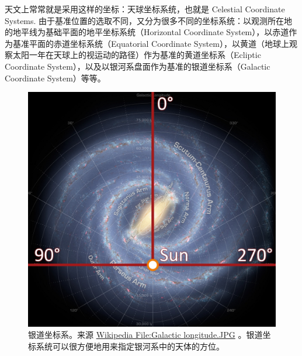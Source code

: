 \documentclass[letterpaper,10pt,english]{sphinxmanual}
\begin{document}
天文上常常就是采用这样的坐标：天球坐标系统，也就是 Celestial Coordinate Systems. 由于基准位置的选取不同，又分为很多不同的坐标系统：以观测所在地的地平线为基础平面的地平坐标系统（Horizontal Coordinate System），以赤道作为基准平面的赤道坐标系统（Equatorial Coordinate System），以黄道（地球上观察太阳一年在天球上的视运动的路径）作为基准的黄道坐标系（Ecliptic Coordinate System），以及以银河系盘面作为基准的银道坐标系（Galactic Coordinate System）等等。
\begin{figure}[htbp]
\centering
\capstart

\includegraphics{galactic_longitude.jpg}
\caption{银道坐标系。来源 \href{https://commons.wikimedia.org/wiki/File:Galactic\_longitude.JPG}{Wikipedia File:Galactic longitude.JPG} 。银道坐标系统可以很方便地用来指定银河系中的天体的方位。}\end{figure}
\end{document}
